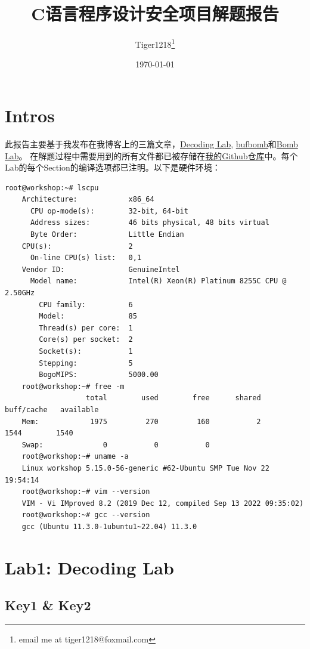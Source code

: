 \documentclass[a4pper,12pt,onecolumn]{article}
\title{C语言程序设计安全项目解题报告}
\author{Tiger1218\thanks{email me at tiger1218@foxmail.com}}
\affil{四川大学网络空间安全学院}
\date{\today}
\begin{document}
\maketitle

\tableofcontents

\section{Intros}

此报告主要基于我发布在我博客上的三篇文章，\href{https://tiger1218.com/2022/12/19/scuccs-c-security-lab1/}{Decoding Lab}, \href{https://tiger1218.com/2022/12/20/scuccs-c-security-lab2/}{bufbomb}和\href{https://tiger1218.com/2022/12/21/scuccs-c-security-lab3/}{Bomb Lab}。
在解题过程中需要用到的所有文件都已被存储在\href{}{我的Github仓库}中。每个Lab的每个Section的编译选项都已注明。以下是硬件环境：

\begin{lstlisting}[style=DOS]
    root@workshop:~# lscpu
    Architecture:            x86_64
      CPU op-mode(s):        32-bit, 64-bit
      Address sizes:         46 bits physical, 48 bits virtual
      Byte Order:            Little Endian
    CPU(s):                  2
      On-line CPU(s) list:   0,1
    Vendor ID:               GenuineIntel
      Model name:            Intel(R) Xeon(R) Platinum 8255C CPU @ 2.50GHz
        CPU family:          6
        Model:               85
        Thread(s) per core:  1
        Core(s) per socket:  2
        Socket(s):           1
        Stepping:            5
        BogoMIPS:            5000.00
    root@workshop:~# free -m
                   total        used        free      shared  buff/cache   available
    Mem:            1975         270         160           2        1544        1540
    Swap:              0           0           0
    root@workshop:~# uname -a
    Linux workshop 5.15.0-56-generic #62-Ubuntu SMP Tue Nov 22 19:54:14
    root@workshop:~# vim --version
    VIM - Vi IMproved 8.2 (2019 Dec 12, compiled Sep 13 2022 09:35:02)
    root@workshop:~# gcc --version
    gcc (Ubuntu 11.3.0-1ubuntu1~22.04) 11.3.0
\end{lstlisting}

\section{Lab1: Decoding Lab}

\subsection{Key1 \& Key2}
\end{document}
